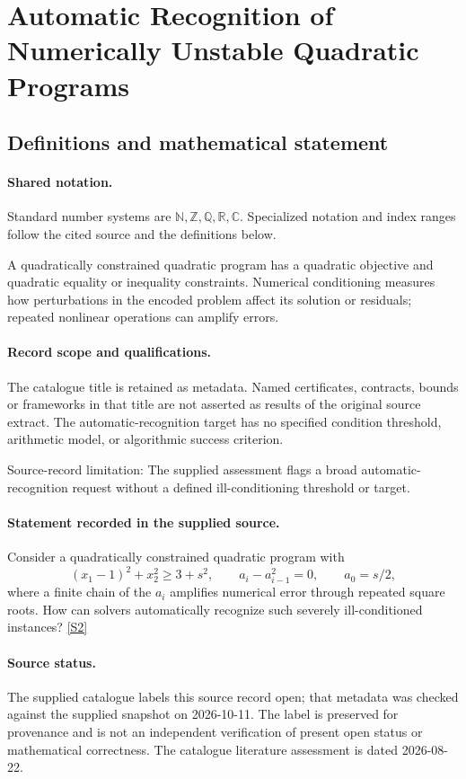 \documentclass[11pt]{article}
\newcommand{\sref}[2]{\hyperlink{source:#1:#2}{[S#2]}}
\begin{document}
\section{Automatic Recognition of Numerically Unstable Quadratic Programs}\label{statement}

\subsection{Definitions and mathematical statement}

\paragraph{Shared notation.}Standard number systems are $\mathbb N,\mathbb Z,\mathbb Q,\mathbb R,\mathbb C$. Specialized notation and index ranges follow the cited source and the definitions below.


A quadratically constrained quadratic program has a quadratic objective and quadratic equality or inequality constraints. Numerical conditioning measures how perturbations in the encoded problem affect its solution or residuals; repeated nonlinear operations can amplify errors.
\paragraph{Record scope and qualifications.}
The catalogue title is retained as metadata. Named certificates, contracts, bounds or frameworks in that title are not asserted as results of the original source extract.
The automatic-recognition target has no specified condition threshold, arithmetic model, or algorithmic success criterion.

Source-record limitation: The supplied assessment flags a broad automatic-recognition request without a defined ill-conditioning threshold or target.
\paragraph{Statement recorded in the supplied source.}
Consider a quadratically constrained quadratic program with $$ (x_1-1)^2+x_2^2\geq3+s^2,\qquad a_i-a_{i-1}^2=0,\qquad a_0=s/2,$$ where a finite chain of the $a_i$ amplifies numerical error through repeated square roots. How can solvers automatically recognize such severely ill-conditioned instances? \sref{statement}{2}
\paragraph{Source status.}
The supplied catalogue labels this source record open; that metadata was checked against the supplied snapshot on 2026-10-11. The label is preserved for provenance and is not an independent verification of present open status or mathematical correctness. The catalogue literature assessment is dated 2026-08-22.
\end{document}
